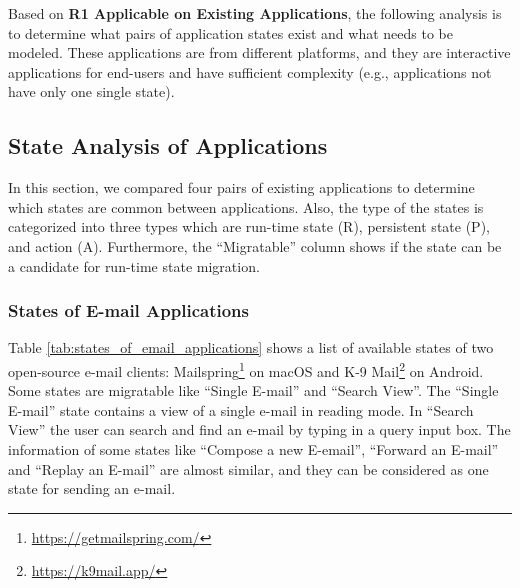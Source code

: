Based on \textbf{R1 Applicable on Existing Applications}, the following analysis is to determine what pairs of application states exist and what needs to be modeled.
These applications are from different platforms, and they are interactive applications for end-users and have sufficient complexity (e.g., applications not have only one single state).

\subsection{State Analysis of Applications}
In this section, we compared four pairs of existing applications to determine which states are common between applications. Also, the type of the states is categorized into three types which are run-time state (R), persistent state (P), and action (A). Furthermore, the “Migratable” column shows if the state can be a candidate for run-time state migration.

\subsubsection{States of E-mail Applications}

Table \ref{tab:states_of_email_applications} shows a list of available states of two open-source e-mail clients: Mailspring\footnote{\url{https://getmailspring.com/}} on macOS and K-9 Mail\footnote{\url{https://k9mail.app/}} on Android. Some states are migratable like “Single E-mail” and “Search View”. The “Single E-mail” state contains a view of a single e-mail in reading mode. In “Search View” the user can search and find an e-mail by typing in a query input box. The information of some states like “Compose a new E-email”, “Forward an E-mail” and “Replay an E-mail” are almost similar, and they can be considered as one state for sending an e-mail.


